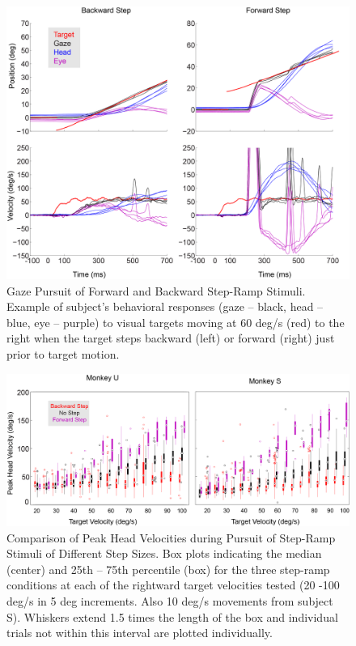 \documentclass[12pt]{article}
\begin{document}
\begin{figure}
\centering
\includegraphics[width=0.7\linewidth]{./figs/StepRampExample}
\caption[Step-Ramp Behavior]{Gaze Pursuit of Forward and Backward Step-Ramp Stimuli. Example of subject’s behavioral responses (gaze – black, head – blue, eye – purple) to visual targets moving at 60 deg/s (red) to the right when the target steps backward (left) or forward (right) just prior to target motion.}
\label{fig:StepRampExample}
\end{figure}

\begin{figure}
\centering
\includegraphics[width=0.9\linewidth]{./figs/StepRampBoxplot}
\caption[Step-Ramp Peak Head Velocity]{Comparison of Peak Head Velocities during Pursuit of Step-Ramp Stimuli of Different Step Sizes. Box plots indicating the median (center) and 25th – 75th percentile (box) for the three step-ramp conditions at each of the rightward target velocities tested (20 -100 deg/s in 5 deg increments. Also 10 deg/s movements from subject S). Whiskers extend 1.5 times the length of the box and individual trials not within this interval are plotted individually.}
\label{fig:StepRampBoxplot}
\end{figure}
\end{document}
